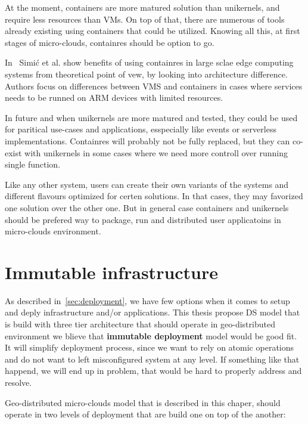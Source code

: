 At the moment, containers are more matured solution than unikernels, and require less resources than VMs. On top of that, there are numerous of tools already existing using containers that could be utilized. Knowing all this, at first stages of micro-clouds, containres should be option to go. 

In~\cite{inproceedingsSimic3} Simi\' c et al. show benefits of using containres in large sclae edge computing systems from theoretical point of vew, by looking into architecture difference. Authors focus on differences between VMS and containers in cases where services needs to be runned on ARM devices with limited resources.

In future and when unikernels are more matured and tested, they could be used for paritical use-cases and applications, esspecially like events or serverless implementations. Containres will probably not be fully replaced, but they can co-exist with unikernels in some cases where we need more controll over running single function.

Like any other system, users can create their own variants of the systems and different flavours optimized for certen solutions. In that cases, they may favorized one solution over the other one. But in general case containers and unikernels should be prefered way to package, run and distributed user applicatoins in micro-clouds environment.
%
%

\section{Immutable infrastructure}\label{sec:immutable_infrastructure}
%
As described in~\ref{sec:deployment}, we have few options when it comes to setup and deply infrastructure and/or applications. This thesis propose DS model that is build with three tier architecture that should operate in geo-distributed environment we blieve that \textbf{immutable deployment} model would be good fit. It will simplify deployment process, since we want to rely on atomic operations and do not want to left misconfigured system at any level. If something like that happend, we will end up in problem, that would be hard to properly address and resolve.

Geo-distributed micro-clouds model that is described in this chaper, should operate in two levels of deployment that are build one on top of the another:

